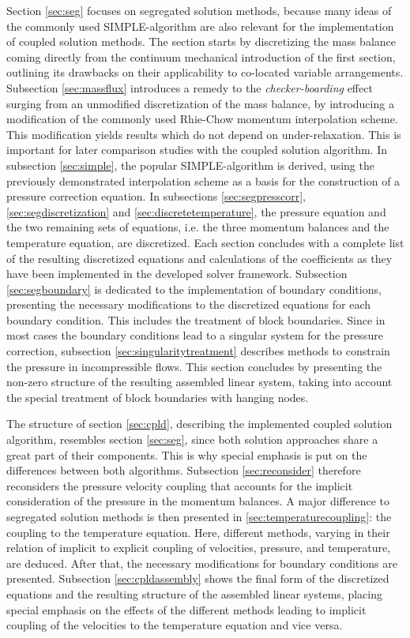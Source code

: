 Section \ref{sec:seg} focuses on segregated solution methods, because many ideas of the commonly used SIMPLE-algorithm are also relevant for the implementation of coupled solution methods. The section starts by discretizing the mass balance coming directly from the continuum mechanical introduction of the first section, outlining its drawbacks on their applicability to co-located variable arrangements. Subsection \ref{sec:massflux} introduces a remedy to the \emph{checker-boarding} effect surging from an unmodified discretization of the mass balance, by introducing a modification of the commonly used Rhie-Chow \cite{rhie82} momentum interpolation scheme. This modification yields results which do not depend on under-relaxation. This is important for later comparison studies with the coupled solution algorithm. In subsection \ref{sec:simple}, the popular SIMPLE-algorithm is derived, using the previously demonstrated interpolation scheme as a basis for the construction of a pressure correction equation. In subsections \ref{sec:segpresscorr}, \ref{sec:segdiscretization} and \ref{sec:discretetemperature}, the pressure equation and the two remaining sets of equations, i.e. the three momentum balances and the temperature equation, are discretized. Each section concludes with a complete list of the resulting discretized equations and calculations of the coefficients as they have been implemented in the developed solver framework. Subsection \ref{sec:segboundary} is dedicated to the implementation of boundary conditions, presenting the necessary modifications to the discretized equations for each boundary condition. This includes the treatment of block boundaries. Since in most cases the boundary conditions lead to a singular system for the pressure correction, subsection \ref{sec:singularitytreatment} describes methods to constrain the pressure in incompressible flows. This section concludes by presenting the non-zero structure of the resulting assembled linear system, taking into account the special treatment of block boundaries with hanging nodes.

The structure of section \ref{sec:cpld}, describing the implemented coupled solution algorithm, resembles section \ref{sec:seg}, since both solution approaches share a great part of their components. This is why special emphasis is put on the differences between both algorithms. Subsection \ref{sec:reconsider} therefore reconsiders the pressure velocity coupling that accounts for the implicit consideration of the pressure in the momentum balances. A major difference to segregated solution methods is then presented in \ref{sec:temperaturecoupling}: the coupling to the temperature equation. Here, different methods, varying in their relation of implicit to explicit coupling of velocities, pressure, and temperature, are deduced. After that, the necessary modifications for boundary conditions are presented. Subsection \ref{sec:cpldassembly} shows the final form of the discretized equations and the resulting structure of the assembled linear systems, placing special emphasis on the effects of the different methods leading to implicit coupling of the velocities to the temperature equation and vice versa.

